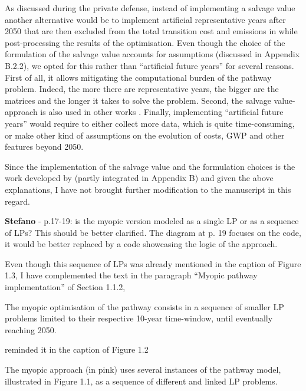 \documentclass[12pt,a4paper]{article}
\begin{document}
As discussed during the private defense, instead of implementing a salvage value another alternative would be to implement artificial representative years after 2050 that are then excluded from the total transition cost and emissions in while post-processing the results of the optimisation. Even though the choice of the formulation of the salvage value accounts for assumptions (discussed in Appendix B.2.2), we opted for this rather than ``artificial future years'' for several reasons. First of all, it allows mitigating the computational burden of the pathway problem. Indeed, the more there are representative years, the bigger are the matrices and the longer it takes to solve the problem. Second, the salvage value-approach is also used in other works \cite{poncelet2016myopic,prina2019transition}. Finally, implementing ``artificial  future years'' would require to either collect more data, which is quite time-consuming, or make other kind of assumptions on the evolution of costs, GWP and other features beyond 2050.

Since the implementation of the salvage value and the formulation choices is the work developed by \citet{limpens2024pathway} (partly integrated in Appendix B) and given the above explanations, I have not brought further modification to the manuscript in this regard.

\begin{mdframed}[style=comment] %
{\color{orange} \textbf{Stefano}} - p.17-19: is the myopic version modeled as a single LP or as a sequence of LPs? This should be better clarified. The diagram at p. 19 focuses on the code, it would be better replaced by a code showcasing the logic of the approach.
\end{mdframed}

\noindent Even though this sequence of LPs was already mentioned {\color{blue}in the caption of Figure 1.3}, I have complemented the text {\color{blue} in the paragraph ``Myopic pathway implementation'' of Section 1.1.2}, 

\begin{mdframed}[style=manuscript] %
[...] The myopic optimisation of the pathway consists in a sequence of smaller LP problems limited to their respective 10-year time-window, until eventually reaching 2050.
\end{mdframed}

\noindent reminded it in the caption of Figure 1.2

\begin{mdframed}[style=manuscript] %
The myopic approach (in pink) uses several instances of the pathway model, illustrated in Figure 1.1, as a sequence of different and linked LP problems. 
\end{mdframed}
\end{document}
